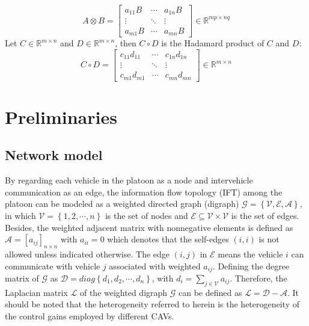 \documentclass[a4paper]{cas-sc}
\begin{document}
\begin{equation*}
  A \otimes B = \left[ {\begin{array}{*{20}{c}}
          {{a_{11}}B} & \cdots & {{a_{1n}}B} \\
          \vdots      & \ddots & \vdots      \\
          {{a_{m1}}B} & \cdots & {{a_{mn}}B}
        \end{array}} \right] \in {\mathbb{R}^{mp \times nq}}
\end{equation*}
Let $C \in {\mathbb{R}^{m \times n}} $ and $D \in {\mathbb{R}^{m \times n}} $, then $C \circ D$ is the Hadamard product of $C$ and $D$:
\begin{equation*}
  C \circ D = \left[ {\begin{array}{*{20}{c}}
          {{c_{11}}{d_{11}}} & \cdots & {{c_{1n}}{d_{1n}}} \\
          \vdots             & \ddots & \vdots             \\
          {{c_{m1}}{d_{m1}}} & \cdots & {{c_{mn}}{d_{mn}}}
        \end{array}} \right] \in {\mathbb{R}^{m \times n}}
\end{equation*}


\section{Preliminaries}
\label{Section 2}

\subsection{Network model}
\label{Section 2.1}

By regarding each vehicle in the platoon as a node and intervehicle communication as an edge, the information flow topology (IFT) among the platoon can be modeled as a weighted directed graph (digraph) $ \mathcal{G} = \left\{ {\mathcal{V},\mathcal{E},\mathcal{A}} \right\}$, in which $\mathcal{V} = \left\{ {1,2, \cdots ,n} \right\}$ is the set of nodes and $\mathcal{E} \subseteq \mathcal{V} \times \mathcal{V} $ is the set of edges. Besides, the weighted adjacent matrix with nonnegative elements is defined as $\mathcal{A} = {[{a_{ij}}]_{n \times n}}$ with ${a_{ii}} = 0$ which denotes that the self-edges $\left( {i,i} \right)$ is not allowed unless indicated otherwise. The edge $\left( {i,j} \right)$ in $\mathcal{E}$ means the vehicle $i$ can communicate with vehicle $j$ associated with weighted ${a_{ij}}$. Defining the degree matrix of $\mathcal{G}$ as $\mathcal{D} = diag\left\{ {{d_1},{d_2}, \cdots ,{d_n}} \right\}$, with ${d_i} = \sum\limits_{j \in \mathcal{V}} {{a_{ij}}} $. Therefore, the Laplacian matrix $\mathcal{L}$ of the weighted digraph $\mathcal{G}$ can be defined as $\mathcal{L} = \mathcal{D} - \mathcal{A}$. It should be noted that the heterogeneity referred to herein is the heterogeneity of the control gains employed by different CAVs.
\end{document}
